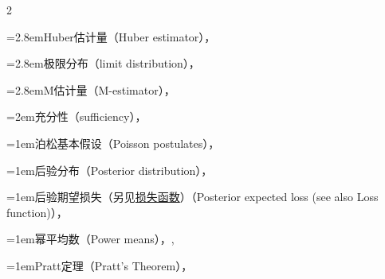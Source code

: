 \begin{multicols}{2}
\par\noindent\hangindent=2.8em\hspace*{1.8em}\label{idx:814}Huber估计量（Huber estimator），\hyperref[ex:10.2.5]{\pageref*{ex:10.2.5}}\par
\par\noindent\hangindent=2.8em\hspace*{1.8em}\label{idx:815}极限分布（limit distribution），\hyperref[eq:10.2.6]{\pageref*{eq:10.2.6}}\par
\par\noindent\hangindent=2.8em\hspace*{1.8em}\label{idx:816}M估计量（M-estimator），\hyperref[sec:10.2.2]{\pageref*{sec:10.2.2}}\par
\par\noindent\hangindent=2em\hspace*{1em}\label{idx:817}充分性（sufficiency），\hyperref[thm:7.3.17]{\pageref*{thm:7.3.17}}\par
\par\addvspace{2pt}
\par\noindent\hangindent=1em\hspace*{0em}\label{idx:818}泊松基本假设（Poisson postulates），\hyperref[thm:3.8.1]{\pageref*{thm:3.8.1}}\par
\par\addvspace{2pt}
\par\noindent\hangindent=1em\hspace*{0em}\label{idx:819}后验分布（Posterior distribution），\hyperref[idxocc:819:293]{\pageref*{idxocc:819:293}}\par
\par\addvspace{2pt}
\par\noindent\hangindent=1em\hspace*{0em}\label{idx:820}后验期望损失（另见\hyperref[idx:653]{损失函数}）（Posterior expected loss (see also Loss function)），\hyperref[eq:7.3.19]{\pageref*{eq:7.3.19}}\par
\par\addvspace{2pt}
\par\noindent\hangindent=1em\hspace*{0em}\label{idx:821}幂平均数（Power means），\hyperref[sec:4.9.2]{\pageref*{sec:4.9.2}}, \hyperref[exercise:7.16]{\pageref*{exercise:7.16}}\par
\par\addvspace{2pt}
\par\noindent\hangindent=1em\hspace*{0em}\label{idx:822}Pratt定理（Pratt’s Theorem），\hyperref[thm:9.3.9]{\pageref*{thm:9.3.9}}\par

\end{multicols}
